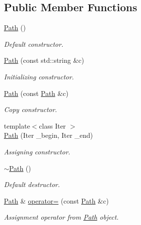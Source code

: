 \subsection*{Public Member Functions}
\begin{DoxyCompactItemize}
\item 
\hyperlink{class_d_d4hep_1_1_path_a43d8eda2bc0394eca5d44ded6556d434}{Path} ()
\begin{DoxyCompactList}\small\item\em Default constructor. \end{DoxyCompactList}\item 
\hyperlink{class_d_d4hep_1_1_path_a29df9b52c07dfecc7015aec057ffe113}{Path} (const std\+::string \&c)
\begin{DoxyCompactList}\small\item\em Initializing constructor. \end{DoxyCompactList}\item 
\hyperlink{class_d_d4hep_1_1_path_aacc0beb72c34b440b89ef40eeec0fe97}{Path} (const \hyperlink{class_d_d4hep_1_1_path}{Path} \&c)
\begin{DoxyCompactList}\small\item\em Copy constructor. \end{DoxyCompactList}\item 
{\footnotesize template$<$class Iter $>$ }\\\hyperlink{class_d_d4hep_1_1_path_ad172701df31032c89397b47832fc5a31}{Path} (Iter \+\_\+begin, Iter \+\_\+end)
\begin{DoxyCompactList}\small\item\em Assigning constructor. \end{DoxyCompactList}\item 
\hyperlink{class_d_d4hep_1_1_path_ac39064d1578702ce969c7b1e1bcb5912}{$\sim$\+Path} ()
\begin{DoxyCompactList}\small\item\em Default destructor. \end{DoxyCompactList}\item 
\hyperlink{class_d_d4hep_1_1_path}{Path} \& \hyperlink{class_d_d4hep_1_1_path_a9d22ed81a818b6d7e982af1c4ea01dc4}{operator=} (const \hyperlink{class_d_d4hep_1_1_path}{Path} \&c)
\begin{DoxyCompactList}\small\item\em Assignment operator from \hyperlink{class_d_d4hep_1_1_path}{Path} object. \end{DoxyCompactList}\item 

\end{DoxyCompactItemize}

